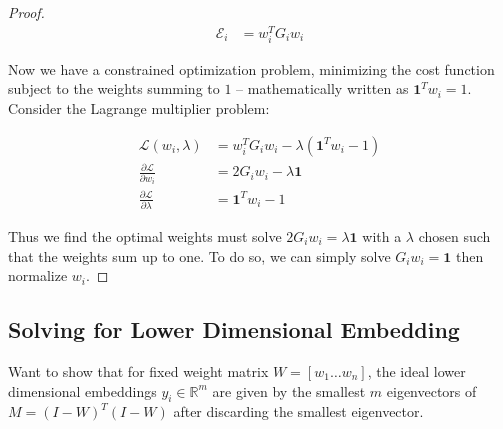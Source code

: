 \documentclass{article}
\begin{document}
\begin{proof}
            \begin{align*}
                \mathcal{E}_i &= w_i^T G_i w_i
            \end{align*}

            Now we have a constrained optimization problem, minimizing the cost function subject to the weights summing to $1$ -- mathematically written as $\mathbf{1}^T w_i = 1$. Consider the Lagrange multiplier problem:

            \begin{align*}
                \mathcal{L}(w_i, \lambda) &= w_i^T G_i w_i - \lambda (\mathbf{1}^T w_i - 1) \\
                \frac{\partial \mathcal{L}}{\partial w_i} &= 2 G_i w_i - \lambda \mathbf{1} \\
                \frac{\partial \mathcal{L}}{\partial \lambda} &= \mathbf{1}^T w_i - 1
            \end{align*}

            Thus we find the optimal weights must solve $2 G_i w_i = \lambda \mathbf{1}$ with a $\lambda$ chosen such that the weights sum up to one. To do so, we can simply solve $G_i w_i = \mathbf{1}$ then normalize $w_i$.
        \end{proof}

    \subsection{Solving for Lower Dimensional Embedding}

        Want to show that for fixed weight matrix $W = [w_1 \ldots w_n]$, the ideal lower dimensional embeddings $y_i \in \mathbb{R}^m$ are given by the smallest $m$ eigenvectors of $M=(I - W)^T (I - W)$ after discarding the smallest eigenvector.
\end{document}
